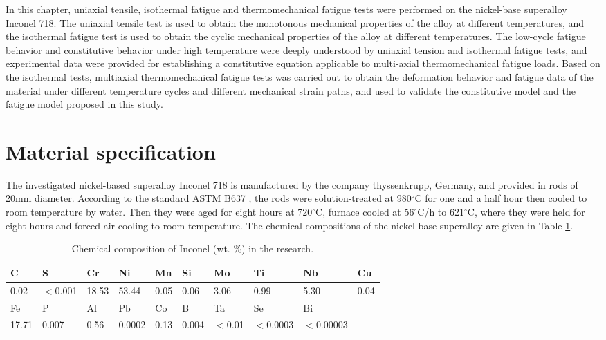 In this chapter, uniaxial tensile, isothermal fatigue and thermomechanical fatigue tests were performed on the nickel-base superalloy Inconel 718. The uniaxial tensile test is used to obtain the monotonous mechanical properties of the alloy at different temperatures, and the isothermal fatigue test is used to obtain the cyclic mechanical properties of the alloy at different temperatures. The low-cycle fatigue behavior and constitutive behavior under high temperature were deeply understood by uniaxial tension and isothermal fatigue tests, and experimental data were provided for establishing a constitutive equation applicable to multi-axial thermomechanical fatigue loads. Based on the isothermal tests, multiaxial thermomechanical fatigue tests was carried out to obtain the deformation behavior and fatigue data of the material under different temperature cycles and different mechanical strain paths, and used to validate the constitutive model and the fatigue model proposed in this study.

\section{Material specification}
\noindent
The investigated nickel-based superalloy Inconel 718 is manufactured by the company thyssenkrupp, Germany, and provided in rods of 20mm diameter. According to the standard ASTM B637 \cite{ASTMB63716}, the rods were solution-treated at 980$^{\circ}$C for one and a half hour then cooled to room temperature by water. Then they were aged for eight hours at 720$^{\circ}$C, furnace cooled at 56$^{\circ}$C/h to 621$^{\circ}$C, where they were held for eight hours and forced air cooling to room temperature.
The chemical compositions of the nickel-base superalloy are given in Table \ref{Tab:ChemicalCompositionofIN718}.

\begin{table}[htbp]
  \centering
  \caption{Chemical composition of Inconel (wt. \%) in the research.}
    \begin{tabular}{llllllllll}
    \toprule
    C     & S     & Cr    & Ni    & Mn    & Si    & Mo    & Ti    & Nb    & Cu \\
    \midrule
    0.02  & $<$0.001 & 18.53 & 53.44 & 0.05  & 0.06  & 3.06  & 0.99  & 5.30  & 0.04 \\
    \midrule
    Fe    & P     & Al    & Pb    & Co    & B     & Ta    & Se    & Bi    &  \\
    \midrule
    17.71 & 0.007 & 0.56  & 0.0002 & 0.13  & 0.004 & $<$0.01 & $<$0.0003 & $<$0.00003 &  \\
    \bottomrule
    \end{tabular}%
  \label{Tab:ChemicalCompositionofIN718}%
\end{table}%

